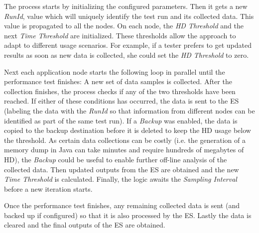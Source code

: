 \documentclass[runningheads,a4paper]{llncs}
\newcommand{\myspaceM}{-7.6pt}
\begin{document}
The process starts by initializing the configured parameters. Then it gets a new
\emph{RunId}, value which will uniquely identify the test run and its collected
data. This value is propagated to all the nodes. On each
node, the \emph{HD Threshold} and the next \emph{Time
Threshold} are initialized. These thresholds allow the approach to adapt to
different usage scenarios. For example, if a tester prefers to get updated
results as soon as new data is collected, she could set the \emph{HD
Threshold} to zero.

Next each application node starts the following loop in parallel until the
performance test finishes: A new set of data samples is collected. After the
collection finishes, the process checks if any of the two thresholds have been
reached. If either of these conditions has occurred, the data is sent to the ES
(labeling the data with the \emph{RunId} so that information from different
nodes can be identified as part of the same test run). If a
\emph{Backup} was enabled, the data is copied to the backup destination before
it is deleted to keep the HD usage below the threshold. As certain data collections 
can be costly (i.e. the generation of a memory dump in Java can take minutes and
require hundreds of megabytes of HD), the \emph{Backup} could be useful to enable
further off-line analysis of the collected data. Then updated outputs from the
ES are obtained and the new \emph{Time Threshold} is calculated. Finally, the logic
awaits the \emph{Sampling Interval} before a new iteration starts.

Once the performance test finishes, any remaining collected data is sent (and
backed up if configured) so that it is also processed by the
ES. Lastly the data is cleared and the final outputs of the ES are
obtained.

\vspace{\myspaceM{}}
\end{document}
